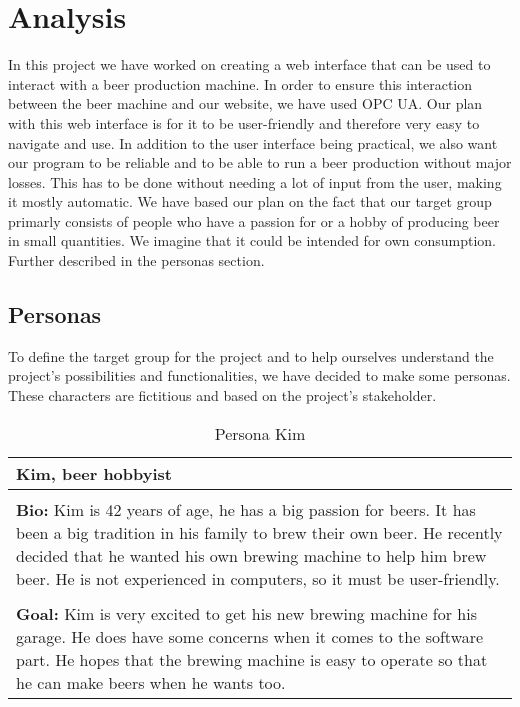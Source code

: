 
\section{Analysis}

In this project we have worked on creating a web interface that can be used to interact with a beer production 
machine. In order to ensure this interaction between the beer machine and our website, we have used OPC UA.\newline
Our plan with this web interface is for it to be user-friendly and therefore very easy to navigate and use. 
In addition to the user interface being practical, we also want our program to be reliable and to be able to run a 
beer production without major losses. This has to be done without needing a lot of input from the user, making 
it mostly automatic.\newline
We have based our plan on the fact that our target group primarly consists of people who have a passion for or a hobby of 
producing beer in small quantities. We imagine that it could be intended for own consumption. Further described in the personas section.\newline

\subsection{Personas}
To define the target group for the project and to help ourselves understand the project's possibilities and functionalities, 
we have decided to make some personas. These characters are fictitious and based on the project's stakeholder. \newline

\begin{table}[htb]
    \begin{center}
        \begin{tabular}{|p{16cm}|}
            \hline
            \textbf{Kim, beer hobbyist}                                                                                                                                                                                                                        \\
            \hline
            \\ \textbf{Bio:} Kim is 42 years of age, he has a big passion for beers. It has been a big tradition in his family to brew their own beer. He recently decided that he wanted his own brewing machine to help him brew beer. He is not experienced in computers, so it must be user-friendly.  \\
            \\
            \textbf{Goal:} Kim is very excited to get his new brewing machine for his garage. He does have some concerns when it comes to the software part. He hopes that the brewing machine is easy to operate so that he can make beers when he wants too. \\
            \hline
        \end{tabular}
        \caption{Persona Kim}
        \label{tab:persona_kim}
    \end{center}
\end{table}


